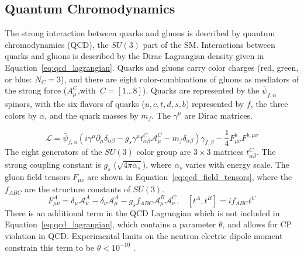 
\subsection{Quantum Chromodynamics}\label{ch:sm:qcd}

The strong interaction between quarks and gluons is described by quantum chromodynamics (QCD), the $SU(3)$ part of the SM. Interactions between quarks and gluons is described by the Dirac Lagrangian density given in Equation~\ref{eq:qcd_lagrangian}. Quarks and gluons carry color charges (red, green, or blue: $N_C = 3$), and there are eight color-combinations of gluons as mediators of the strong force ($A^C_\mu$,with~$C=[1...8]$). Quarks are represented by the $\bar{\psi}_{f,\alpha}$ spinors, with the six flavors of quarks ($u,c,t,d,s,b$) represented by $f$, the three colors by $\alpha$, and the quark masses by $m_f$. The $\gamma^\mu$ are Dirac matrices.


\begin{equation}
    \mathcal{L}=\bar{\psi}_{f,\alpha}(i\gamma^\mu \partial_\mu \delta_{\alpha\beta}-g_s\gamma^\mu t^C_{\alpha\beta}\mathcal{A}^C_\mu-m_f\delta_{\alpha\beta})\gamma_{f,\beta}-\frac{1}{4}F^b_{\mu\nu}F^{b,\mu\nu}
    \label{eq:qcd_lagrangian}
\end{equation}
 The eight generators of the $SU(3)$ color group are $3\times 3$ matrices $t^C_{\alpha\beta}$. The strong coupling constant is $g_s$ ($\sqrt{4\pi\alpha_s}$), where $\alpha_s$ varies with energy scale.  The gluon field tensors $F_{\mu\nu}$ are shown in Equation~\ref{eq:qcd_field_tensors}, where the $f_{ABC}$ are the structure constants of $SU(3)$.
\begin{equation}
F_{\mu\nu}^A = \delta_{\mu} \mathcal{A}^A_{\nu} - \delta_{\nu} \mathcal{A}^A_\mu - g_s f_{ABC} \mathcal{A}_\mu^B \mathcal{A}_\nu^C,~~~~ [t^A, t^B] = if_{ABC}t^C
\label{eq:qcd_field_tensors}
\end{equation}
There is an additional term in the QCD Lagrangian which is not included in Equation~\ref{eq:qcd_lagrangian}, which contains a parameter $\theta$, and allows for CP violation in QCD. Experimental limits on the neutron electric dipole moment constrain this term to be $\theta < 10^{-10}$ \cite{PhysRevLett.97.131801}.

